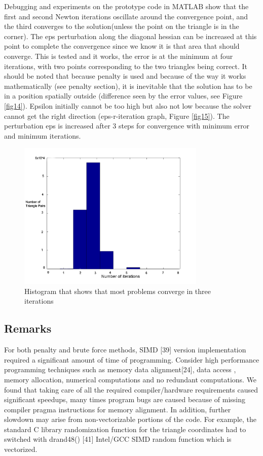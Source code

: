 \documentclass[times,12pt]{ACME2015article}
\begin{document}
Debugging and experiments on the prototype code in MATLAB show that the first and second Newton iterations oscillate around the convergence point, and the third converges to the solution(unless the point on the triangle is in the corner). The eps perturbation along the diagonal hessian can be increased at this point to complete the convergence since we know it is that area that should converge. This is tested and it works, the error is at the minimum at four iterations, with two points corresponding to the two triangles being correct. It should be noted that because penalty is used and because of the way it works mathematically (see penalty section), it is inevitable that the solution has to be in a position spatially outside (difference seen by the error values, see Figure \ref{fig14}). Epsilon initially cannot be too high but also not low because the solver cannot get the right direction (eps-r-iteration graph, Figure \ref{fig15}). The perturbation eps is increased after 3 steps for convergence with minimum error and minimum iterations. 

\begin{figure}[!h]
\centerline{\includegraphics[width=0.8\textwidth]{norma.png}} \protect\caption{\label{fig16}Histogram that shows that most problems converge in three iterations}
\end{figure} 

\subsection{Remarks}

For both penalty and brute force methods, SIMD [39] version implementation required a significant amount of time of programming. Consider high performance programming techniques such as memory data alignment[24], data access , memory allocation, numerical computations and no redundant computations. We found that taking care of all the required compiler/hardware requirements caused significant speedups, many times program bugs are caused because of missing compiler pragma instructions for memory alignment. In addition, further slowdown may arise from non-vectorizable portions of the code. For example, the standard C library randomization function for the triangle coordinates had to switched with drand48() [41] Intel/GCC SIMD random function which is vectorized.
\end{document}
